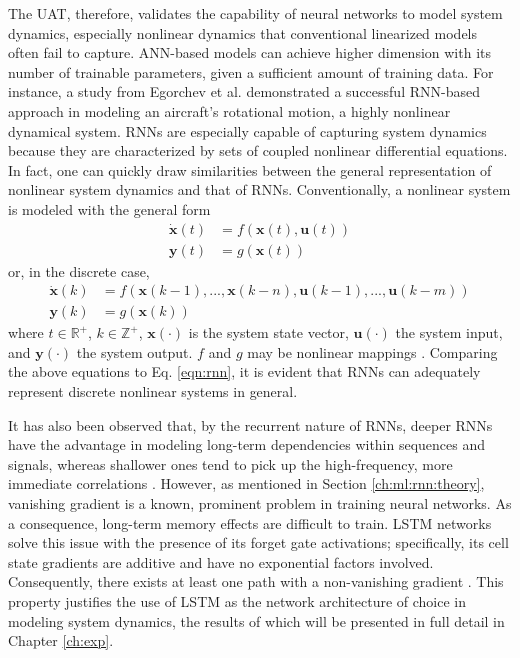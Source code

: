 The UAT, therefore, validates the capability of neural networks to model system dynamics, especially nonlinear dynamics that conventional linearized models often fail to capture. ANN-based models can achieve higher dimension with its number of trainable parameters, given a sufficient amount of training data. For instance, a study from Egorchev et al. \cite{egorchev} demonstrated a successful RNN-based approach in modeling an aircraft's rotational motion, a highly nonlinear dynamical system. RNNs are especially capable of capturing system dynamics because they are characterized by sets of coupled nonlinear differential equations. In fact, one can quickly draw similarities between the general representation of nonlinear system dynamics and that of RNNs. Conventionally, a nonlinear system is modeled with the general form 
\begin{equation}
    \label{eqn:nonlinear_cts}
    \begin{split}
        \Dot{\mathbf{x}}(t) & = f\left(\mathbf{x}(t), \mathbf{u}(t) \right) \\
        \mathbf{y}(t) & = g\left(\mathbf{x}(t)\right)
    \end{split}
\end{equation}
or, in the discrete case, 
\begin{equation}
    \label{eqn:nonlinear_discrete}
    \begin{split}
        \Dot{\mathbf{x}}(k) & = f\left(\mathbf{x}(k-1),...,\mathbf{x}(k-n), \mathbf{u}(k-1),...,\mathbf{u}(k-m) \right) \\
        \mathbf{y}(k) & = g\left(\mathbf{x}(k)\right)
    \end{split}
\end{equation}
where $t \in \mathbb{R}^+$, $k \in \mathbb{Z}^+$, $\mathbf{x}(\cdot)$ is the system state vector, $\mathbf{u}(\cdot)$ the system input, and $\mathbf{y}(\cdot)$ the system output. $f$ and $g$ may be nonlinear mappings \cite{wang}. Comparing the above equations to Eq. \ref{eqn:rnn}, it is evident that RNNs can adequately represent discrete nonlinear systems in general.

It has also been observed that, by the recurrent nature of RNNs, deeper RNNs have the advantage in modeling long-term dependencies within sequences and signals, whereas shallower ones tend to pick up the high-frequency, more immediate correlations \cite{drnn}. However, as mentioned in Section \ref{ch:ml:rnn:theory}, vanishing gradient is a known, prominent problem in training neural networks. As a consequence, long-term memory effects are difficult to train. LSTM networks solve this issue with the presence of its forget gate activations; specifically, its cell state gradients are additive and have no exponential factors involved. Consequently, there exists at least one path with a non-vanishing gradient \cite{arbel_lstm_gradient}. This property justifies the use of LSTM as the network architecture of choice in modeling system dynamics, the results of which will be presented in full detail in Chapter \ref{ch:exp}. 